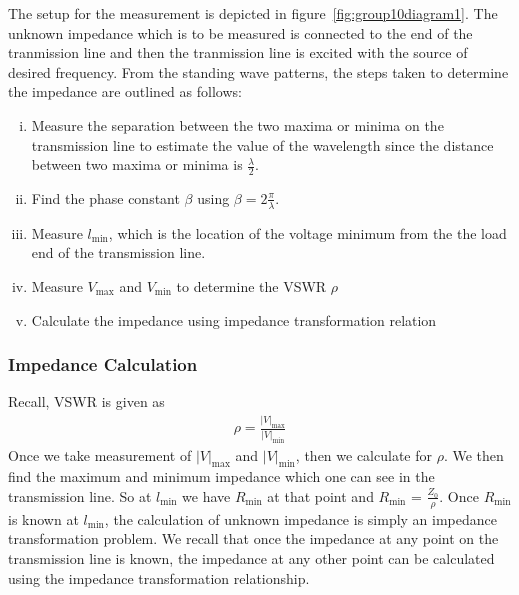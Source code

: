 The setup for the measurement is depicted in figure~\ref{fig:group10diagram1}. The unknown impedance which is to be measured is connected to the end of the tranmission line and then the tranmission line is excited with the source of desired frequency. From the standing wave patterns, the steps taken to determine the impedance are outlined as follows:
\begin{enumerate}[(i)]
\item Measure the separation between the two maxima or minima on the transmission line to estimate the value of the wavelength since the distance between two maxima or minima is $\frac{\lambda}{2}$.
\item Find the phase constant $\beta$ using $\beta = 2\frac{\pi}{\lambda}$.
\item Measure $l_\min$, which is the location of the voltage minimum from the the load end of the transmission line.
\item Measure $V_\max$ and $V_\min$ to determine the VSWR $\rho$
\item Calculate the impedance using impedance transformation relation
\end{enumerate}

\subsubsection{Impedance Calculation}
Recall, VSWR is given as
\begin{align}
\rho = \frac{|V|_\max}{|V|_\min}
\end{align}
Once we take measurement of $|V|_\max$ and $|V|_\min$, then we calculate for $ \rho $. We then find the maximum and minimum impedance which one can see in the transmission line. So at $l_\min$ we have $R_\min$ at that point and $R_\min$ = $\frac{Z_0}{\rho}$. Once $R_\min$ is known at $l_\min$, the calculation of unknown impedance is simply an impedance transformation problem. We recall that once the impedance at any point on the transmission line is known, the impedance at any other point can be calculated using the impedance transformation relationship.


